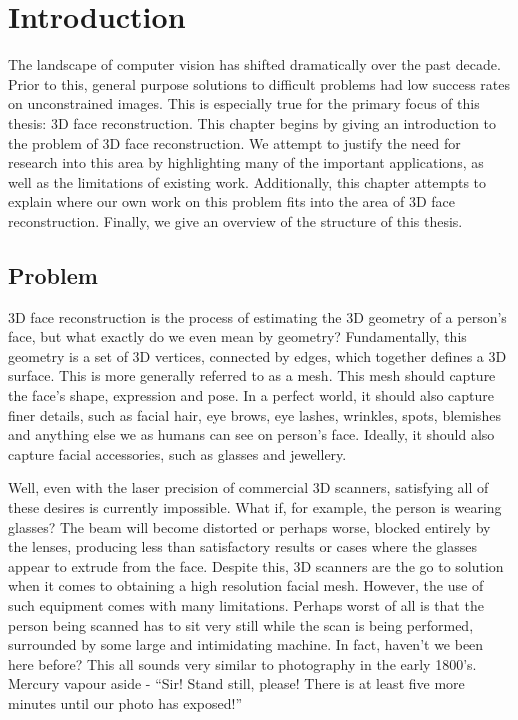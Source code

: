 \graphicspath{{chapter_introduction/}}
\chapter{Introduction}

The landscape of computer vision has shifted dramatically over the
past decade. Prior to this, general purpose solutions to difficult
problems had low success rates on unconstrained images. This is
especially true for the primary focus of this thesis: 3D face
reconstruction. This chapter begins by giving an introduction to the
problem of 3D face reconstruction. We attempt to justify the need for
research into this area by highlighting many of the important
applications, as well as the limitations of existing
work. Additionally, this chapter attempts to explain where our own
work on this problem fits into the area of 3D face
reconstruction. Finally, we give an overview of the structure of this
thesis.

\section{Problem}

3D face reconstruction is the process of estimating the 3D geometry of
a person's face, but what exactly do we even mean by geometry?
Fundamentally, this geometry is a set of 3D vertices, connected by
edges, which together defines a 3D surface. This is more generally
referred to as a mesh. This mesh should capture the face's shape,
expression and pose. In a perfect world, it should also capture finer
details, such as facial hair, eye brows, eye lashes, wrinkles, spots,
blemishes and anything else we as humans can see on person's
face. Ideally, it should also capture facial accessories, such as
glasses and jewellery.

Well, even with the laser precision of commercial 3D scanners,
satisfying all of these desires is currently impossible. What if, for
example, the person is wearing glasses? The beam will become distorted
or perhaps worse, blocked entirely by the lenses, producing less than
satisfactory results or cases where the glasses appear to extrude from
the face. Despite this, 3D scanners are the go to solution when it
comes to obtaining a high resolution facial mesh. However, the use of
such equipment comes with many limitations. Perhaps worst of all is
that the person being scanned has to sit very still while the scan is
being performed, surrounded by some large and intimidating machine. In
fact, haven't we been here before? This all sounds very similar to
photography in the early 1800's. Mercury vapour aside - ``Sir! Stand
still, please! There is at least five more minutes until our photo has
exposed!''

